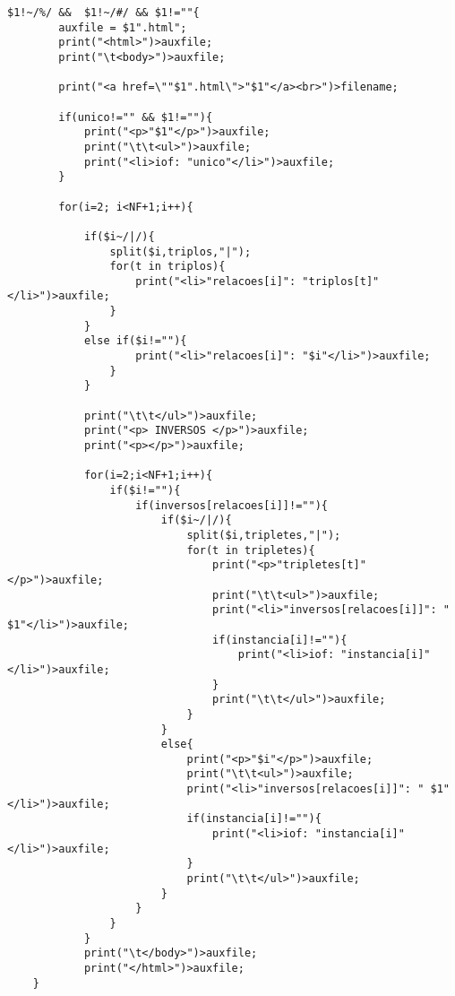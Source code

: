 \documentclass{report}
\begin{document}
\begin{verbatim}
$1!~/%/ &&  $1!~/#/ && $1!=""{  
        auxfile = $1".html"; 
        print("<html>")>auxfile; 
        print("\t<body>")>auxfile; 
                                
        print("<a href=\""$1".html\">"$1"</a><br>")>filename;

        if(unico!="" && $1!=""){
            print("<p>"$1"</p>")>auxfile;
            print("\t\t<ul>")>auxfile;
            print("<li>iof: "unico"</li>")>auxfile;
        }

        for(i=2; i<NF+1;i++){
                            
            if($i~/|/){
                split($i,triplos,"|");
                for(t in triplos){
                    print("<li>"relacoes[i]": "triplos[t]"</li>")>auxfile;
                }
            }
            else if($i!=""){
                    print("<li>"relacoes[i]": "$i"</li>")>auxfile;
                }
            }

            print("\t\t</ul>")>auxfile;
            print("<p> INVERSOS </p>")>auxfile;
            print("<p></p>")>auxfile;

            for(i=2;i<NF+1;i++){
                if($i!=""){
                    if(inversos[relacoes[i]]!=""){
                        if($i~/|/){
                            split($i,tripletes,"|");
                            for(t in tripletes){
                                print("<p>"tripletes[t]"</p>")>auxfile;
                                print("\t\t<ul>")>auxfile;
                                print("<li>"inversos[relacoes[i]]": " $1"</li>")>auxfile;
                                if(instancia[i]!=""){
                                    print("<li>iof: "instancia[i]"</li>")>auxfile;
                                }
                                print("\t\t</ul>")>auxfile;
                            }
                        }
                        else{
                            print("<p>"$i"</p>")>auxfile;
                            print("\t\t<ul>")>auxfile;
                            print("<li>"inversos[relacoes[i]]": " $1"</li>")>auxfile;
                            if(instancia[i]!=""){
                                print("<li>iof: "instancia[i]"</li>")>auxfile;
                            }
                            print("\t\t</ul>")>auxfile;
                        }
                    }
                }
            }
            print("\t</body>")>auxfile;
            print("</html>")>auxfile;
    }
\end{verbatim} 
\end{document}
